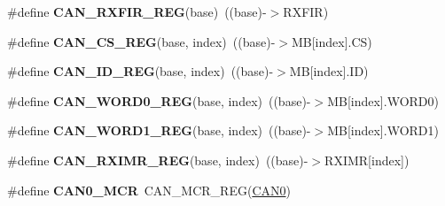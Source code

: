 \begin{DoxyCompactItemize}
\item 
\#define {\bfseries C\+A\+N\+\_\+\+R\+X\+F\+I\+R\+\_\+\+R\+EG}(base)~((base)-\/$>$R\+X\+F\+IR)\hypertarget{group__CAN__Register__Accessor__Macros_ga61ab5ba295876c0b3eee23094ea58ad0}{}\label{group__CAN__Register__Accessor__Macros_ga61ab5ba295876c0b3eee23094ea58ad0}

\item 
\#define {\bfseries C\+A\+N\+\_\+\+C\+S\+\_\+\+R\+EG}(base,  index)~((base)-\/$>$MB\mbox{[}index\mbox{]}.CS)\hypertarget{group__CAN__Register__Accessor__Macros_ga2c092376e84accc60ab30d58a90313a2}{}\label{group__CAN__Register__Accessor__Macros_ga2c092376e84accc60ab30d58a90313a2}

\item 
\#define {\bfseries C\+A\+N\+\_\+\+I\+D\+\_\+\+R\+EG}(base,  index)~((base)-\/$>$MB\mbox{[}index\mbox{]}.ID)\hypertarget{group__CAN__Register__Accessor__Macros_gab54aefacb08bef26ec56d7fbeb066fe6}{}\label{group__CAN__Register__Accessor__Macros_gab54aefacb08bef26ec56d7fbeb066fe6}

\item 
\#define {\bfseries C\+A\+N\+\_\+\+W\+O\+R\+D0\+\_\+\+R\+EG}(base,  index)~((base)-\/$>$MB\mbox{[}index\mbox{]}.W\+O\+R\+D0)\hypertarget{group__CAN__Register__Accessor__Macros_ga6c38c61f1d64c516230b88731857a4b8}{}\label{group__CAN__Register__Accessor__Macros_ga6c38c61f1d64c516230b88731857a4b8}

\item 
\#define {\bfseries C\+A\+N\+\_\+\+W\+O\+R\+D1\+\_\+\+R\+EG}(base,  index)~((base)-\/$>$MB\mbox{[}index\mbox{]}.W\+O\+R\+D1)\hypertarget{group__CAN__Register__Accessor__Macros_ga4202b53149fc2a037d1597d719f11dca}{}\label{group__CAN__Register__Accessor__Macros_ga4202b53149fc2a037d1597d719f11dca}

\item 
\#define {\bfseries C\+A\+N\+\_\+\+R\+X\+I\+M\+R\+\_\+\+R\+EG}(base,  index)~((base)-\/$>$R\+X\+I\+MR\mbox{[}index\mbox{]})\hypertarget{group__CAN__Register__Accessor__Macros_ga05f466b5d47a11a4920d35ef2374f9cb}{}\label{group__CAN__Register__Accessor__Macros_ga05f466b5d47a11a4920d35ef2374f9cb}

\item 
\#define {\bfseries C\+A\+N0\+\_\+\+M\+CR}~C\+A\+N\+\_\+\+M\+C\+R\+\_\+\+R\+EG(\hyperlink{group__CAN__Peripheral__Access__Layer_ga8882ee5d18ec64b8193396ec6bc66fe5}{C\+A\+N0})\hypertarget{group__CAN__Register__Accessor__Macros_ga300565478bb512e7ca03af0ecf31137a}{}\label{group__CAN__Register__Accessor__Macros_ga300565478bb512e7ca03af0ecf31137a}


\end{DoxyCompactItemize}
